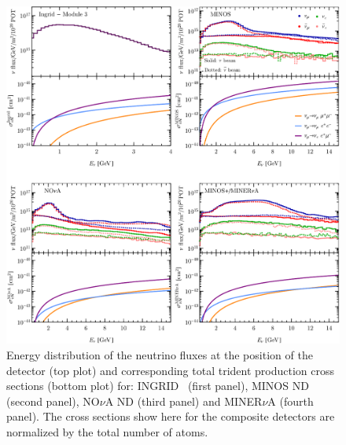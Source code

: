 \begin{figure}[t]
\centering
\includegraphics[width=\textwidth]{figs/NLAr_f+xsec.pdf}
\caption{\label{fig:others}
Energy distribution of the neutrino fluxes at the position of the detector (top plot) and 
corresponding total trident production cross sections (bottom plot) for:
INGRID~\cite{Abe:2015biq} (first panel), MINOS ND~\cite{fluxes:nonLAr} (second panel), NO$\nu$A ND\cite{fluxes:nonLAr} (third panel)
and MINER$\nu$A\cite{fluxes:nonLAr} (fourth panel).
The cross sections show here for the composite detectors are normalized by the total number of 
atoms.}
\end{figure}


